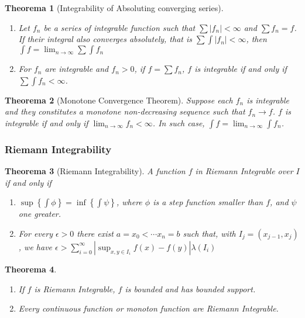 \documentclass[12pt, a4paper]{article}
\newtheorem{theorem}{Theorema}
\theoremstyle{definition}
\theoremstyle{remark}
\begin{document}
\begin{theorem}[Integrability of Absoluting converging series]
	\begin{enumerate}
		\item 	Let $f_n$ be a series of integrable function such that $\sum |f_n| < \infty$ and $\sum f_n = f$. If their integral also converges absolutely, that is $\sum \int |f_n| < \infty$, then $\int f = \lim_{n \rightarrow  \infty} \sum \int f_n$
		\item For $f_n$ are integrable and $f_n > 0$, if $f = \sum f_n$, $f$ is integrable if and only if $\sum \int f_n < \infty$. 
	\end{enumerate}
\end{theorem}

\begin{theorem}[Monotone Convergence Theorem]
	Suppose each $f_n$ is integrable and they constitutes a monotone non-decreasing sequence such that $f_n \rightarrow  f$. $f$ is integrable if and only if $\lim_{n \rightarrow  \infty} f_n < \infty$. In such case, $\int f = \lim_{n \rightarrow  \infty} \int f_n$.
\end{theorem}

\subsubsection{Riemann Integrability}

\begin{theorem}[Riemann Integrability]
	A function $f$ in Riemann Integrable over $I$ if and only if 
	\begin{enumerate}
		\item $\sup \left\{ \int \phi \right\} = \inf \left\{ \int \psi \right\}$, where $\phi$ is a step function smaller than $f$, and $\psi$ one greater.
		\item For every $\epsilon > 0$ there exist $a = x_0 < \cdots x_n = b$ such that, with $I_j = (x_{j-1}, x_j)$, we have 
			$\epsilon > \sum^{\infty} _{i=0} |\sup_{x, y \in I_i}{f(x)-f(y)}| \lambda(I_i) $
	\end{enumerate}
\end{theorem}

\begin{theorem}
	\begin{enumerate}
		\item If $f$ is Riemann Integrable, $f$ is bounded and has bounded support.
		\item Every continuous function or monoton function are Riemann Integrable.
	\end{enumerate}
\end{theorem}
\end{document}

